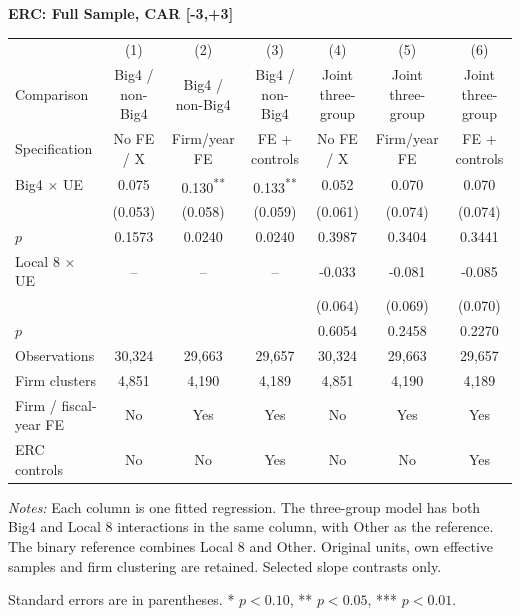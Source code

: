 \documentclass[10pt]{article}
\newcommand{\sym}[1]{\textsuperscript{#1}}
\begin{document}
\begin{minipage}{23.60cm}
\fontsize{10}{12}\selectfont
\setlength{\tabcolsep}{4pt}\renewcommand{\arraystretch}{1.08}
{\large\bfseries ERC: Full Sample, CAR [-3,+3]}\par\medskip
\begin{tabular*}{\linewidth}{@{\extracolsep{\fill}}lcccccc@{}}
\toprule
 & (1) & (2) & (3) & (4) & (5) & (6) \\
Comparison & Big4 / non-Big4 & Big4 / non-Big4 & Big4 / non-Big4 & Joint three-group & Joint three-group & Joint three-group \\
Specification & No FE / X & Firm/year FE & FE + controls & No FE / X & Firm/year FE & FE + controls \\
\midrule
Big4 $\times$ UE & 0.075 & 0.130\sym{**} & 0.133\sym{**} & 0.052 & 0.070 & 0.070 \\
 & (0.053) & (0.058) & (0.059) & (0.061) & (0.074) & (0.074) \\
$p$ & 0.1573 & 0.0240 & 0.0240 & 0.3987 & 0.3404 & 0.3441 \\
Local 8 $\times$ UE & -- & -- & -- & -0.033 & -0.081 & -0.085 \\
 &  &  &  & (0.064) & (0.069) & (0.070) \\
$p$ &  &  &  & 0.6054 & 0.2458 & 0.2270 \\
\midrule
Observations & 30,324 & 29,663 & 29,657 & 30,324 & 29,663 & 29,657 \\
Firm clusters & 4,851 & 4,190 & 4,189 & 4,851 & 4,190 & 4,189 \\
Firm / fiscal-year FE & No & Yes & Yes & No & Yes & Yes \\
ERC controls & No & No & Yes & No & No & Yes \\
\bottomrule\end{tabular*}\par\medskip
\fontsize{9}{11}\selectfont\textit{Notes:} Each column is one fitted regression. The three-group model has both Big4 and Local 8 interactions in the same column, with Other as the reference. The binary reference combines Local 8 and Other. Original units, own effective samples and firm clustering are retained. Selected slope contrasts only.
\par Standard errors are in parentheses. * $p<0.10$, ** $p<0.05$, *** $p<0.01$.
\end{minipage}
\end{document}
